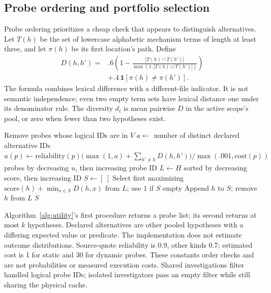 \documentclass[letterpaper,journal]{IEEEtran}
\begin{document}
\subsection{Probe ordering and portfolio selection}\label{sec:utility}
Probe ordering prioritizes a cheap check that appears to distinguish alternatives. Let $T(h)$ be the set of lowercase alphabetic mechanism terms of length at least three, and let $\pi(h)$ be its first location's path. Define
\begin{equation}\label{eq:distance}
\begin{aligned}
D(h,h')={}&.6\left(1-\frac{|T(h)\cap T(h')|}{\max(1,|T(h)\cup T(h')|)}\right)
\\ &+.4\,\mathbf{1}[\pi(h)\ne\pi(h')].
\end{aligned}
\end{equation}
The formula combines lexical difference with a different-file indicator. It is not semantic independence; even two empty term sets have lexical distance one under its denominator rule. The diversity $d_t$ is mean pairwise $D$ in the active scope's pool, or zero when fewer than two hypotheses exist.

\begin{algorithm}[t]
\caption{Two separate utility procedures (canonical Algorithm 3)}\label{alg:utility}
\begin{algorithmic}[1]\small
{}
  \State Remove probes whose logical IDs are in $V$
    \State $a\gets$ number of distinct declared alternative IDs
    \State $u(p)\gets \mathrm{reliability}(p)\bigl(\max(1,a)+\sum_{h'\ne h}D(h,h')\bigr)/\max(.001,\mathrm{cost}(p))$
  \EndFor
  \State \Return probes by decreasing $u$, then increasing probe ID
\EndProcedure
{}
  \State $L\gets H$ sorted by decreasing score, then increasing ID
  \State $S\gets[\ ]$
    \State Select first maximizing $\mathrm{score}(h)+\min_{x\in S}D(h,x)$ from $L$; use $1$ if $S$ empty
    \State Append $h$ to $S$; remove $h$ from $L$
  \EndWhile
  \State \Return $S$
\EndProcedure
\end{algorithmic}
\end{algorithm}

Algorithm~\ref{alg:utility}'s first procedure returns a probe list; its second returns at most $k$ hypotheses. Declared alternatives are other pooled hypotheses with a differing expected value or predicate. The implementation does not estimate outcome distributions. Source-quote reliability is 0.9, other kinds 0.7; estimated cost is 1 for static and 30 for dynamic probes. These constants order checks and are not probabilities or measured execution costs. Shared investigations filter handled logical probe IDs; isolated investigators pass an empty filter while still sharing the physical cache.
\end{document}
